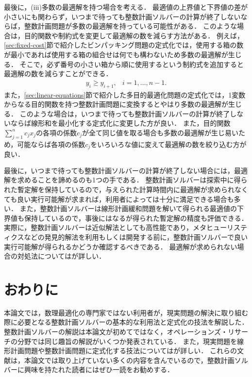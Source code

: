 \documentclass[japanese]{jnlp_1.4}
\begin{document}
最後に，(iii)多数の最適解を持つ場合を考える．
最適値の上界値と下界値の差が小さいにも関わらず，いつまで待っても整数計画ソルバーの計算が終了しないならば，整数計画問題が多数の最適解を持っている可能性がある．
このような場合は，目的関数や制約式を変更して最適解の数を減らす方法がある．
例えば，\ref{sec:fixed-cost}節で紹介したビンパッキング問題の定式化では，使用する箱の数が最小であれば使用する箱の組合せは何でも構わないため多数の最適解が生じる．
そこで，必ず番号の小さい箱から順に使用するという制約式を追加すると最適解の数を減らすことができる．
\begin{equation}
\begin{array}{ll}
y_i \ge y_{i+1}, & i=1,\dots,n-1.
\end{array}
\end{equation}
また，\ref{sec:linear-equations}節で紹介した多目的最適化問題の定式化では，1変数からなる目的関数を持つ整数計画問題に変換するとやはり多数の最適解が生じる．
このような場合は，いつまで待っても整数計画ソルバーの計算が終了しないならば線形和を最小化する定式化に変更した方が良い．
また，目的関数$\sum_{j=1}^n c_j x_j$の各項の係数$c_j$が全て同じ値を取る場合も多数の最適解が生じ易いため，可能ならば各項の係数$c_j$をいろいろな値に変えて最適解の数を絞り込む方が良い．

最後に，いつまで待っても整数計画ソルバーの計算が終了しない場合には，最適解を求めることを諦めるのも1つの手である．
整数計画ソルバーは探索中に得られた暫定解を保持しているので，与えられた計算時間内に最適解が求められなくても良い実行可能解が求まれば，利用者によっては十分に満足できる場合も多い．
また，整数計画ソルバーは線形計画緩和問題を解いて得られる最適値の下界値も保持しているので，事後にはなるが得られた暫定解の精度も評価できる．
実際に，整数計画ソルバーは近似解法としても高性能であり，メタヒューリスティクスなどの発見的解法を利用もしくは開発する前に，整数計画ソルバーで良い実行可能解が得られるかどうか確認するべきである．
最適解が求められない場合の対処法については\cite{MiyashiroR-Web,MiyashiroR2006}が詳しい．


\section{おわりに}
\label{sec:conclusion}

本論文では，数理最適化の専門家ではない利用者が，現実問題の解決に取り組む際に必要となる整数計画ソルバーの基本的な利用法と定式化の技法を解説した．
整数計画ソルバーの解説は本論文が初めてではなく，オペレーションズ・リサーチの分野では同じ趣旨の解説がいくつか発表されている\cite{FujieT2012,MiyashiroR2006,MiyashiroR2012}．
また，現実問題を線形計画問題や整数計画問題に定式化する技法については\cite{KuboM2012,WilliamsHP2013}が詳しい．
これらの文献は，本論文では取り上げていない多くの内容を含んでいるので，整数計画ソルバーに興味を持たれた読者にはぜひ一読をお勧めする．
\end{document}
